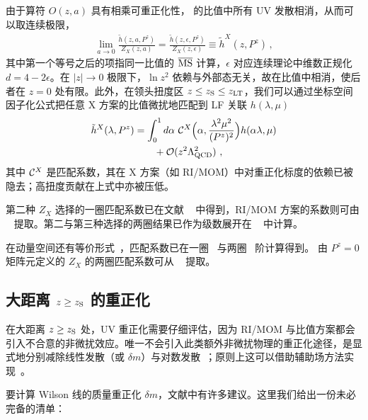 由于算符 $O(z,a)$ 具有相乘可重正化性， 的比值中所有 UV 发散相消，从而可以取连续极限，
\begin{align}\label{eq:ratio2}
\lim_{a\to0} \frac{{\tilde h}(z,a,P^z)}{Z_X(z,a)} = \frac{{\tilde h}(z,\epsilon,P^z)}{Z_X(z,\epsilon)} \equiv\tilde h^X(z,P^z)\,,
\end{align}
其中第一个等号之后的项指同一比值的 ${\overline{\rm MS}}$ 计算，$\epsilon$ 对应连续理论中维数正规化 $d=4-2\epsilon$。在 $|z|\to0$ 极限下，$\ln z^2$ 依赖与外部态无关，故在比值中相消，使后者在 $z=0$ 处有限。此外，在领头扭度区 $z\le z_{\rm S} \le z_{\rm LT}$，我们可以通过坐标空间因子化公式把任意 X 方案的比值微扰地匹配到 LF 关联 $h(\lambda,\mu)$~\cite{Izubuchi:2018srq,Radyushkin:2017lvu}
\begin{align}\label{eq:coordfact}
\tilde h^X(\lambda, P^z) & =\int_{0}^1 d\alpha\ {\cal C}^X\Big(\alpha,\frac{\lambda^2\mu^2}{(P^z)^2}\Big) h(\alpha\lambda,\mu) \nonumber\\
&\qquad + {\cal O}(z^2\Lambda_{\rm QCD}^2)\ ,
\end{align}
其中 ${\cal C}^X$ 是匹配系数，其在 X 方案（如 RI/MOM）中对重正化标度的依赖已被隐去；高扭度贡献在上式中亦被压低。

第二种 $Z_X$ 选择的一圈匹配系数已在文献 ~\cite{Zhang:2018ggy,Radyushkin:2017lvu,Izubuchi:2018srq} 中得到，RI/MOM 方案的系数则可由 ~\cite{Constantinou:2017sej,Izubuchi:2018srq} 提取。第二与第三种选择的两圈结果已作为级数展开在 ~\cite{Li:2020xml} 中计算。

 在动量空间还有等价形式~\cite{Izubuchi:2018srq}，匹配系数已在一圈~\cite{Stewart:2017tvs,Liu:2018uuj,Liu:2018hxv} 与两圈~\cite{Chen:2020ody} 阶计算得到。
由 $P^z=0$ 矩阵元定义的 $Z_X$ 的两圈匹配系数可从 ~\cite{Chen:2020ody,Li:2020xml} 提取。

\subsection{大距离 $z\ge z_{\rm S}$ 的重正化}
\label{sec:long}

在大距离 $z\ge z_{\rm S}$ 处，UV 重正化需要仔细评估，因为 RI/MOM 与比值方案都会引入不合意的非微扰效应。唯一不会引入此类额外非微扰物理的重正化途径，是显式地分别减除线性发散（或 $\delta m$）与对数发散~\cite{Chen:2016fxx,Ji:2017oey,Ishikawa:2017faj,Green:2017xeu}；原则上这可以借助辅助场方法实现~\cite{Green:2017xeu,Green:2020xco}。

要计算 Wilson 线的质量重正化 $\delta m$，文献中有许多建议。这里我们给出一份未必完备的清单：

